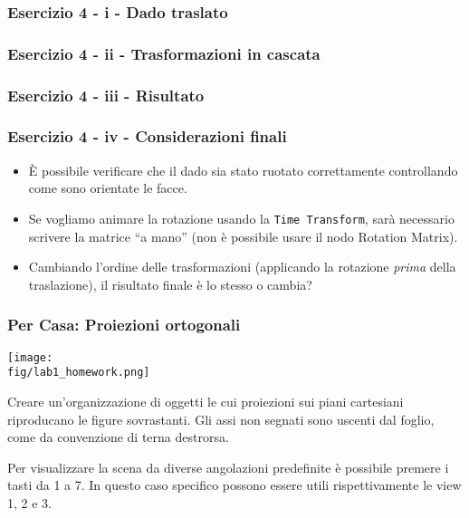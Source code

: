 \documentclass{beamer}
\newcommand{\fig}{figures}
\begin{document}
\begin{frame}
\frametitle{Esercizio 4 - i - Dado traslato}
\begin{center}
\end{center}
\end{frame}
\begin{frame}
\frametitle{Esercizio 4 - ii - Trasformazioni in cascata}
\begin{center}
\end{center}
\end{frame}
\begin{frame}
\frametitle{Esercizio 4 - iii - Risultato}
\begin{center}
\end{center}
\end{frame}

\begin{frame}
\frametitle{Esercizio 4 - iv - Considerazioni finali}
\begin{itemize}
\item \`E possibile verificare che il dado sia stato ruotato correttamente controllando come sono orientate le facce.
\item Se vogliamo animare la rotazione usando la \texttt{Time Transform}, sar\`a necessario scrivere la matrice ``a mano''
    (non \`e possibile usare il nodo Rotation Matrix).
\item Cambiando l'ordine delle trasformazioni (applicando la rotazione \textit{prima} della traslazione),
    il risultato finale \`e lo stesso o cambia?
\end{itemize}
\end{frame}

\begin{frame}
\frametitle{Per Casa: Proiezioni ortogonali}
\texttt{[image: \\fig/lab1\_homework.png]}

\vspace{20pt}

Creare un'organizzazione di oggetti le cui proiezioni sui piani cartesiani riproducano le figure sovrastanti.
Gli assi non segnati sono uscenti dal foglio, come da convenzione di terna destrorsa.

\vspace {0.5cm}

Per visualizzare la scena da diverse angolazioni predefinite \`e possibile premere i tasti da 1 a 7.
In questo caso specifico possono essere utili rispettivamente le view 1, 2 e 3.
\end{frame}
\end{document}
